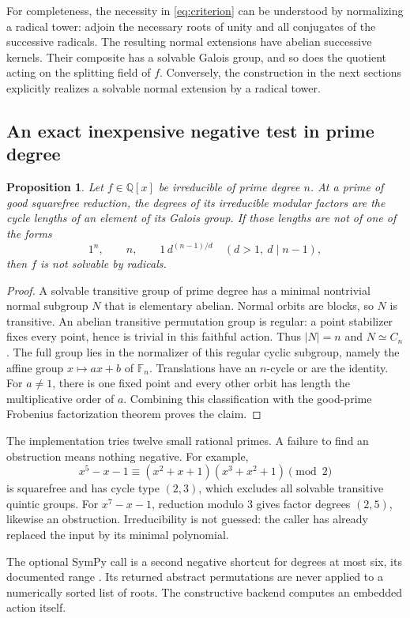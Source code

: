 \documentclass[11pt,letterpaper]{article}
\newtheorem{proposition}[theorem]{Proposition}
\theoremstyle{definition}\newtheorem{definition}[theorem]{Definition}
\theoremstyle{remark}\newtheorem{remark}[theorem]{Remark}
\newcommand{\Q}{\mathbb Q}\newcommand{\C}{\mathbb C}\newcommand{\Z}{\mathbb Z}
\begin{document}
For completeness, the necessity in \eqref{eq:criterion} can be understood by
normalizing a radical tower: adjoin the necessary roots of unity and all
conjugates of the successive radicals. The resulting normal extensions have
abelian successive kernels. Their composite has a solvable Galois group, and
so does the quotient acting on the splitting field of \(f\). Conversely, the
construction in the next sections explicitly realizes a solvable normal
extension by a radical tower.

\subsection{An exact inexpensive negative test in prime degree}
\begin{proposition}
Let \(f\in\Q[x]\) be irreducible of prime degree \(n\). At a prime of good
squarefree reduction, the degrees of its irreducible modular factors are the
cycle lengths of an element of its Galois group. If those lengths are not of
one of the forms
\[
 1^n,\qquad n,\qquad 1\,d^{(n-1)/d}\quad(d>1,\ d\mid n-1),
\]
then \(f\) is not solvable by radicals.
\end{proposition}
\begin{proof}
A solvable transitive group of prime degree has a minimal nontrivial normal
subgroup \(N\) that is elementary abelian. Normal orbits are blocks, so \(N\)
is transitive. An abelian transitive permutation group is regular: a point
stabilizer fixes every point, hence is trivial in this faithful action.
Thus \(|N|=n\) and \(N\simeq C_n\). The full group lies in the normalizer
of this regular cyclic subgroup, namely the affine group
\(x\mapsto ax+b\) of \(\mathbb F_n\). Translations have an \(n\)-cycle or
are the identity. For \(a\ne1\), there is one fixed point and every other
orbit has length the multiplicative order of \(a\). Combining this
classification with the good-prime Frobenius factorization theorem proves
the claim.
\end{proof}
The implementation tries twelve small rational primes. A failure to find an
obstruction means nothing negative. For example,
\[
 x^5-x-1\equiv(x^2+x+1)(x^3+x^2+1)\pmod2
\]
is squarefree and has cycle type \((2,3)\), which excludes all solvable
transitive quintic groups. For \(x^7-x-1\), reduction modulo 3 gives factor
degrees \((2,5)\), likewise an obstruction. Irreducibility is not guessed:
the caller has already replaced the input by its minimal polynomial.

The optional SymPy  call is a second negative shortcut for
degrees at most six, its documented range \cite{sympyfields}. Its returned
abstract permutations are never applied to a numerically sorted list of roots.
The constructive backend computes an embedded action itself.
\end{document}
